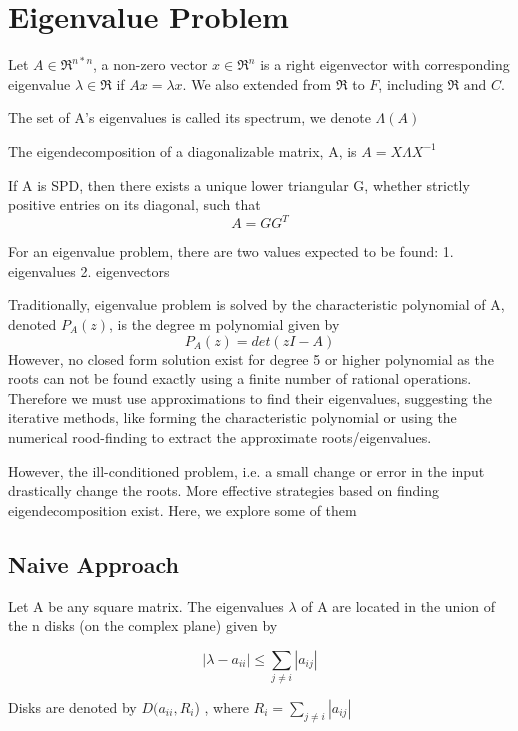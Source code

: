 \chapter{Eigenvalue Problem}
\label{chapter2}

    \begin{definition}
        Let $A\in \Re^{n*n}$, a non-zero vector $x\in\Re^n$ is a right eigenvector with corresponding eigenvalue $\lambda \in \Re$ if $Ax = \lambda x$. We also extended  from $\Re$ to $F$, including $\Re \text{ and } C$.
    \end{definition}
    
    \begin{definition}[Spectrum]
        The set of A's eigenvalues is called its spectrum, we denote $\Lambda(A)$
    \end{definition}

    \begin{definition}[Eigendecomposition]
    The eigendecomposition of a diagonalizable matrix, A, is $A = X \Lambda X^{-1}$
        
    \end{definition}

    \begin{theorem}
        If A is SPD, then there exists a unique lower triangular G, whether strictly positive entries on its diagonal, such that
        \[A=GG^T\]
    \end{theorem}
For an eigenvalue problem, there are two values expected to be found: 1. eigenvalues 2. eigenvectors

Traditionally, eigenvalue problem is solved by the characteristic polynomial of A, denoted $P_A(z)$, is the degree m polynomial given by 
\[P_A(z) = det(zI-A)\]
However, no closed form solution exist for degree 5 or higher polynomial as the roots can not be found exactly using a finite number of rational operations. Therefore we must use approximations to find their eigenvalues, suggesting the iterative methods, like forming the characteristic polynomial or using the numerical rood-finding to extract the approximate roots/eigenvalues.

However, the ill-conditioned problem, i.e. a small change or error in the input drastically change the roots. More effective strategies based on finding eigendecomposition exist. Here, we explore some of them
\section{Naive Approach}
    \begin{theorem}
        Let A be any square matrix. The eigenvalues $\lambda$ of A are located in the union of the n disks (on the complex plane) given by 
    
        \[|\lambda-a_{ii}| \leq \sum_{j\neq i} |a_{ij}| \]
        
    Disks are denoted by $D(a_{ii}, R_i$) , where $R_i = \sum_{j\neq i} |a_{ij}| $
    \end{theorem}
    
